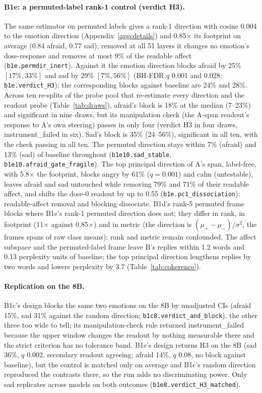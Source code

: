 \documentclass[11pt]{article}
\newcommand{\rid}[1]{{\footnotesize\texttt{#1}}}
\begin{document}
\paragraph{B1e: a permuted-label rank-1 control (verdict H3).} The same estimator on permuted labels gives a rank-1 direction with cosine 0.004 to the emotion direction (Appendix~\ref{app:details}) and 0.85$\times$ its footprint on average (0.84 afraid, 0.77 sad); removed at all 51 layers it changes no emotion's dose-response and removes at most 9\% of the readable affect (\rid{b1e.permdir\_inert}). Against it the emotion direction blocks afraid by 25\% $[17\%, 33\%]$ and sad by 29\% $[7\%, 56\%]$ (BH-FDR $q$ 0.001 and 0.028; \rid{b1e.verdict\_H3}); the corresponding blocks against baseline are 24\% and 28\%. Across ten re-splits of the probe pool that re-estimate every direction and the readout probe (Table~\ref{tab:draws}), afraid's block is 18\% at the median (7--23\%) and significant in nine draws, but its manipulation check (the A-span readout's response to A's own steering) passes in only four (verdict H3 in four draws, instrument\_failed in six). Sad's block is 35\% (24--56\%), significant in all ten, with the check passing in all ten. The permuted direction stays within 7\% (afraid) and 13\% (sad) of baseline throughout (\rid{b1e10.sad\_stable}, \rid{b1e10.afraid\_gate\_fragile}). The top principal direction of A's span, label-free, with 5.8$\times$ the footprint, blocks angry by 61\% ($q=0.001$) and calm (untestable), leaves afraid and sad untouched while removing 79\% and 71\% of their readable affect, and shifts the dose-0 readout by up to 0.55 (\rid{b1e.pc1\_dissociation}): readable-affect removal and blocking dissociate. B1d's rank-5 permuted frame blocks where B1e's rank-1 permuted direction does not; they differ in rank, in footprint (11$\times$ against 0.85$\times$) and in metric (the direction is $(\mu_+-\mu_-)/\sigma^2$, the frames spans of raw class means); rank and metric remain confounded. The affect subspace and the permuted-label frame leave B's replies within 1.2 words and 0.13 perplexity units of baseline; the top principal direction lengthens replies by two words and lowers perplexity by 3.7 (Table~\ref{tab:coherence}).

\paragraph{Replication on the 8B.} B1c's design blocks the same two emotions on the 8B by unadjusted CIs (afraid 15\%, sad 31\% against the random direction; \rid{b1c8.verdict\_and\_block}), the other three too wide to tell; its manipulation-check rule returned instrument\_failed because the upper window changes the readout by nothing measurable there and the strict criterion has no tolerance band. B1e's design returns H3 on the 8B (sad 36\%, $q$ 0.002, secondary readout agreeing; afraid 14\%, $q$ 0.08, no block against baseline), but the control is matched only on average and B1c's random direction reproduced the contrasts there, so the run adds no discriminating power. Only sad replicates across models on both outcomes (\rid{b1e8.verdict\_H3\_matched}).
\end{document}
